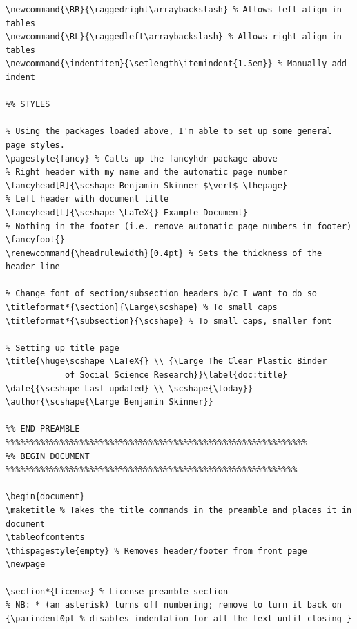 \documentclass[12pt]{article}
\newcommand{\RR}{\raggedright\arraybackslash} %
\newcommand{\RL}{\raggedleft\arraybackslash} %
\newcommand{\indentitem}{\setlength\itemindent{1.5em}} %
\renewcommand{\headrulewidth}{0.4pt} %
\begin{document}
\begin{verbatim}
\newcommand{\RR}{\raggedright\arraybackslash} % Allows left align in tables
\newcommand{\RL}{\raggedleft\arraybackslash} % Allows right align in tables
\newcommand{\indentitem}{\setlength\itemindent{1.5em}} % Manually add indent

%% STYLES

% Using the packages loaded above, I'm able to set up some general page styles.
\pagestyle{fancy} % Calls up the fancyhdr package above
% Right header with my name and the automatic page number
\fancyhead[R]{\scshape Benjamin Skinner $\vert$ \thepage}
% Left header with document title
\fancyhead[L]{\scshape \LaTeX{} Example Document}
% Nothing in the footer (i.e. remove automatic page numbers in footer)
\fancyfoot{}
\renewcommand{\headrulewidth}{0.4pt} % Sets the thickness of the header line

% Change font of section/subsection headers b/c I want to do so
\titleformat*{\section}{\Large\scshape} % To small caps
\titleformat*{\subsection}{\scshape} % To small caps, smaller font

% Setting up title page
\title{\huge\scshape \LaTeX{} \\ {\Large The Clear Plastic Binder 
            of Social Science Research}}\label{doc:title}
\date{{\scshape Last updated} \\ \scshape{\today}}
\author{\scshape{\Large Benjamin Skinner}}

%% END PREAMBLE	%%%%%%%%%%%%%%%%%%%%%%%%%%%%%%%%%%%%%%%%%%%%%%%%%%%%%%%%%%%%%
%% BEGIN DOCUMENT %%%%%%%%%%%%%%%%%%%%%%%%%%%%%%%%%%%%%%%%%%%%%%%%%%%%%%%%%%%

\begin{document}
\maketitle % Takes the title commands in the preamble and places it in document
\tableofcontents
\thispagestyle{empty} % Removes header/footer from front page
\newpage

\section*{License} % License preamble section
% NB: * (an asterisk) turns off numbering; remove to turn it back on
{\parindent0pt % disables indentation for all the text until closing }


\end{verbatim}
\end{document}
